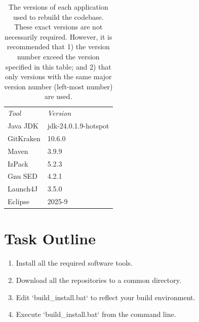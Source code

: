 \documentclass{article}
\begin{document}
\begin{table}[t]
    \centering
    \begin{tabular}{ll}
         \emph{Tool} & \emph{Version} \\
         Java JDK & jdk-24.0.1.9-hotspot \\
         GitKraken & 10.6.0 \\
         Maven & 3.9.9 \\
         IzPack & 5.2.3 \\
         Gnu SED & 4.2.1 \\
         Launch4J & 3.5.0 \\         
         Eclipse &  2025-9 \\
    \end{tabular}
    \caption{The versions of each application used to rebuild the codebase.  These exact versions are not necessarily required.  However, it is recommended that 1) the version number exceed the version specified in this table; and 2) that only versions with the same major version number (left-most number) are used.}
    \label{tab:versions}
\end{table}

\section{Task Outline}
\begin{enumerate}
    \item Install all the required software tools.
    \item Download all the repositories to a common directory.
    \item Edit `build\_install.bat` to reflect your build environment.
    \item Execute `build\_install.bat` from the command line.
\end{enumerate}
\end{document}
